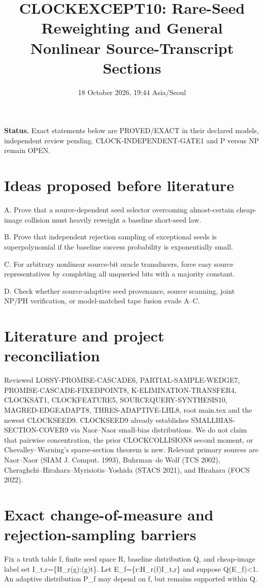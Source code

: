 \documentclass[11pt]{article}
\title{CLOCKEXCEPT10: Rare-Seed Reweighting and General Nonlinear Source-Transcript Sections}
\date{18 October 2026, 19:44 Asia/Seoul}
\begin{document}
\maketitle
\noindent\textbf{Status.} Exact statements below are PROVED/EXACT in their declared models, independent review pending. CLOCK-INDEPENDENT-GATE1 and P versus NP remain OPEN.

\section*{Ideas proposed before literature}
\item[] A. Prove that a source-dependent seed selector overcoming almost-certain cheap-image collision must heavily reweight a baseline short-seed law.
\item[] B. Prove that independent rejection sampling of exceptional seeds is superpolynomial if the baseline success probability is exponentially small.
\item[] C. For arbitrary nonlinear source-bit oracle transducers, force easy source representatives by completing all unqueried bits with a majority constant.
\item[] D. Check whether source-adaptive seed provenance, source scanning, joint NP/PH verification, or model-matched tape fusion evade A--C.

\section*{Literature and project reconciliation}
Reviewed LOSSY-PROMISE-CASCADE6, PARTIAL-SAMPLE-WEDGE7, PROMISE-CASCADE-FIXEDPOINT8, K-ELIMINATION-TRANSFER4, CLOCKSAT1, CLOCKFEATURE5, SOURCEQUERY-SYNTHESIS10, MAGRED-EDGEADAPT8, THRES-ADAPTIVE-LHL8, root main.tex and the newest CLOCKSEED9. CLOCKSEED9 already establishes SMALLBIAS-SECTION-COVER9 via Naor--Naor small-bias distributions. We do not claim that pairwise concentration, the prior CLOCKCOLLISION8 second moment, or Chevalley--Warning's sparse-section theorem is new. Relevant primary sources are Naor--Naor (SIAM J. Comput. 1993), Buhrman--de Wolf (TCS 2002), Cheraghchi--Hirahara--Myrisiotis--Yoshida (STACS 2021), and Hirahara (FOCS 2022).

\section*{Exact change-of-measure and rejection-sampling barriers}
Fix a truth table f, finite seed space R, baseline distribution Q, and cheap-image label set
I_{t,r}=\{H_r(g):(g)\le t\}.
Let E_f=\{r:H_r(f)\notin I_{t,r}\} and suppose Q(E_f)\le\delta<1. An adaptive distribution P_f may depend on f, but remains supported within Q.
\end{document}
